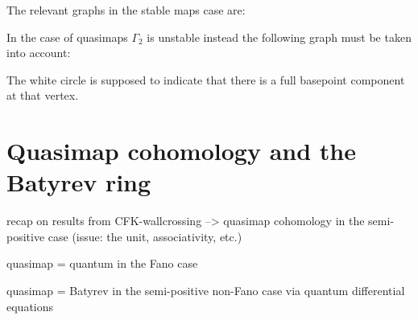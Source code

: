 \documentclass[11pt]{amsart}
\theoremstyle{definition}
\theoremstyle{definition}
\begin{document}
The relevant graphs in the stable maps case are:
\begin{center}
\end{center}
In the case of quasimaps $\Gamma_2$ is unstable instead the following graph must be taken into account:
\begin{center}
\end{center}
The white circle is supposed to indicate that there is a full basepoint component at that vertex.


\section{Quasimap cohomology and the Batyrev ring}

recap on results from CFK-wallcrossing --> quasimap cohomology in the semi-positive case (issue: the unit, associativity, etc.)

quasimap = quantum in the Fano case

quasimap = Batyrev in the semi-positive non-Fano case via quantum differential equations






\bigskip\bigskip


\end{document}
